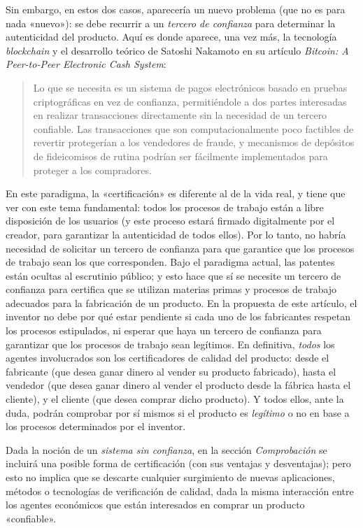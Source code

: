 \documentclass[12pt,a4paper]{article}
\begin{document}
Sin embargo, en estos dos casos, aparecería un nuevo problema (que no es para nada «nuevo»): se debe recurrir a un \textit{tercero de confianza} para determinar la autenticidad del producto. Aquí es donde aparece, una vez más, la tecnología \textit{blockchain} y el desarrollo teórico de Satoshi Nakamoto en su artículo \textit{Bitcoin: A Peer-to-Peer Electronic Cash System}:

\begin{quotation}
Lo que se necesita es un sistema de pagos electrónicos basado en pruebas criptográficas en vez de confianza, permitiéndole a dos partes interesadas en realizar transacciones directamente sin la necesidad de un tercero confiable. Las transacciones que son computacionalmente poco factibles de revertir protegerían a los vendedores de fraude, y mecanismos de depósitos de fideicomisos de rutina podrían ser fácilmente implementados para proteger a los compradores. \cite[pág.~1]{bitcoin}
\end{quotation}

En este paradigma, la «certificación» es diferente al de la vida real, y tiene que ver con este tema fundamental: todos los procesos de trabajo están a libre disposición de los usuarios (y este proceso estará firmado digitalmente por el creador, para garantizar la autenticidad de todos ellos). Por lo tanto, no habría necesidad de solicitar un tercero de confianza para que garantice que los procesos de trabajo sean los que corresponden. Bajo el paradigma actual, las patentes están ocultas al escrutinio público; y esto hace que sí se necesite un tercero de confianza para certifica que se utilizan materias primas y procesos de trabajo adecuados para la fabricación de un producto. En la propuesta de este artículo, el inventor no debe por qué estar pendiente si cada uno de los fabricantes respetan los procesos estipulados, ni esperar que haya un tercero de confianza para garantizar que los procesos de trabajo sean legítimos. En definitiva, \textit{todos} los agentes involucrados son los certificadores de calidad del producto: desde el fabricante (que desea ganar dinero al vender su producto fabricado), hasta el vendedor (que desea ganar dinero al vender el producto desde la fábrica hasta el cliente), y el cliente (que desea comprar dicho producto). Y todos ellos, ante la duda, podrán comprobar por sí mismos si el producto es \textit{legítimo} o no en base a los procesos determinados por el inventor.

Dada la noción de un \textit{sistema sin confianza}, en la sección \textit{Comprobación} se incluirá una posible forma de certificación (con sus ventajas y desventajas); pero esto no implica que se descarte cualquier surgimiento de nuevas aplicaciones, métodos o tecnologías de verificación de calidad, dada la misma interacción entre los agentes económicos que están interesados en comprar un producto «confiable».
\end{document}
